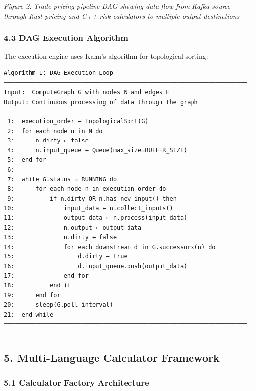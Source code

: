 \documentclass[
]{article}
\begin{document}
\emph{Figure 2: Trade pricing pipeline DAG showing data flow from Kafka
source through Rust pricing and C++ risk calculators to multiple output
destinations}

\hypertarget{dag-execution-algorithm}{%
\subsubsection{4.3 DAG Execution
Algorithm}\label{dag-execution-algorithm}}

The execution engine uses Kahn's algorithm for topological sorting:

\begin{verbatim}
Algorithm 1: DAG Execution Loop
─────────────────────────────────────────────────────────────────────
Input:  ComputeGraph G with nodes N and edges E
Output: Continuous processing of data through the graph

 1:  execution_order ← TopologicalSort(G)
 2:  for each node n in N do
 3:      n.dirty ← false
 4:      n.input_queue ← Queue(max_size=BUFFER_SIZE)
 5:  end for
 6:  
 7:  while G.status = RUNNING do
 8:      for each node n in execution_order do
 9:          if n.dirty OR n.has_new_input() then
10:              input_data ← n.collect_inputs()
11:              output_data ← n.process(input_data)
12:              n.output ← output_data
13:              n.dirty ← false
14:              for each downstream d in G.successors(n) do
15:                  d.dirty ← true
16:                  d.input_queue.push(output_data)
17:              end for
18:          end if
19:      end for
20:      sleep(G.poll_interval)
21:  end while
─────────────────────────────────────────────────────────────────────
\end{verbatim}

\begin{center}\rule{0.5\linewidth}{0.5pt}\end{center}

\hypertarget{multi-language-calculator-framework}{%
\subsection{5. Multi-Language Calculator
Framework}\label{multi-language-calculator-framework}}

\hypertarget{calculator-factory-architecture}{%
\subsubsection{5.1 Calculator Factory
Architecture}\label{calculator-factory-architecture}}
\end{document}
